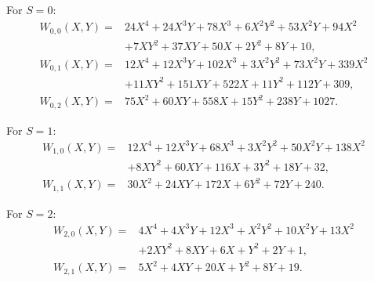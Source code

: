 \documentclass[11pt]{amsart}
\numberwithin{equation}{section}
\theoremstyle{remark}
\begin{document}
For $S=0$:
\begin{align*}
W_{0,0}(X,Y)={}&24X^4+24X^3Y+78X^3+6X^2Y^2+53X^2Y+94X^2\\
&+7XY^2+37XY+50X+2Y^2+8Y+10,\\
W_{0,1}(X,Y)={}&12X^4+12X^3Y+102X^3+3X^2Y^2+73X^2Y+339X^2\\
&+11XY^2+151XY+522X+11Y^2+112Y+309,\\
W_{0,2}(X,Y)={}&75X^2+60XY+558X+15Y^2+238Y+1027.
\end{align*}

For $S=1$:
\begin{align*}
W_{1,0}(X,Y)={}&12X^4+12X^3Y+68X^3+3X^2Y^2+50X^2Y+138X^2\\
&+8XY^2+60XY+116X+3Y^2+18Y+32,\\
W_{1,1}(X,Y)={}&30X^2+24XY+172X+6Y^2+72Y+240.
\end{align*}

For $S=2$:
\begin{align*}
W_{2,0}(X,Y)={}&4X^4+4X^3Y+12X^3+X^2Y^2+10X^2Y+13X^2\\
&+2XY^2+8XY+6X+Y^2+2Y+1,\\
W_{2,1}(X,Y)={}&5X^2+4XY+20X+Y^2+8Y+19.
\end{align*}



\end{document}

